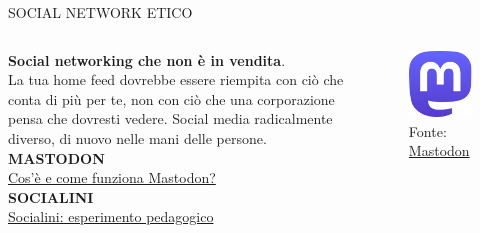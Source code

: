 \documentclass[aspectratio=1610]{beamer}
\begin{document}
\begin{frame}{SOCIAL NETWORK ETICO}
    \begin{columns}
            \justifying
            \textbf{Social networking che non è in vendita}.\\
            La tua home feed dovrebbe essere riempita con ciò che conta di più per te, 
            non con ciò che una corporazione pensa che dovresti vedere. Social media 
            radicalmente diverso, di nuovo nelle mani delle persone.\\
            \bigskip
            \tiny{\textbf{MASTODON}}\\
            \tiny{\href{https://joinmastodon.org/it}{Cos'è e come funziona Mastodon?}}\\
            \bigskip
            \tiny{\textbf{SOCIALINI}}\\
            \tiny{\href{https://socialini.it/}{Socialini: esperimento pedagogico}}
            \begin{figure}
                \includegraphics[width=\linewidth]{img/mastodon.png}
                \caption{{Fonte: \href{https://joinmastodon.org/it}{Mastodon}}}
            \end{figure}
    \end{columns}
\end{frame}
\end{document}
